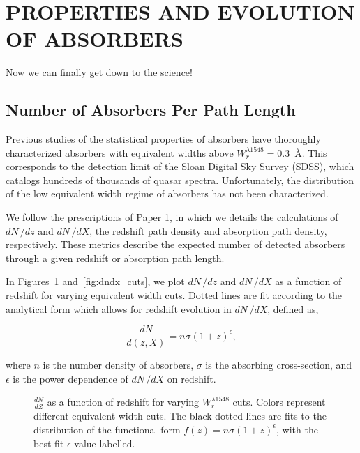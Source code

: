 \section{\MakeUppercase{Properties and Evolution of {\CIV} Absorbers}}
\label{ch6}

Now we can finally get down to the science!

\subsection{Number of Absorbers Per Path Length}
\label{ch6:dndx}


Previous studies of the statistical properties of {\CIV} absorbers have thoroughly characterized {\CIV} absorbers with equivalent widths above $W_r^{\lambda1548} = 0.3$~{\AA}. This corresponds to the detection limit of the Sloan Digital Sky Survey (SDSS), which catalogs hundreds of thousands of quasar spectra. Unfortunately, the distribution of the low equivalent width regime of {\CIV} absorbers has not been characterized.

We follow the prescriptions of Paper 1, in which we details the calculations of $dN\,/dz$ and $dN\,/dX$, the redshift path density and absorption path density, respectively. These metrics describe the expected number of detected absorbers through a given redshift or absorption path length.

In Figures~\ref{fig:dndz_cuts} and~\ref{fig:dndx_cuts}, we plot $dN\,/dz$ and $dN\,/dX$ as a function of redshift for varying equivalent width cuts. Dotted lines are fit according to the analytical form which allows for redshift evolution in $dN\,/dX$, defined as,

\begin{equation}
\frac{dN}{d(z,X)} = n\sigma (1 + z)^{\epsilon},
\label{eqn:dndxfit}
\end{equation}

where $n$ is the number density of {\CIV} absorbers, $\sigma$ is the absorbing cross-section, and $\epsilon$ is the power dependence of $dN\,/dX$ on redshift.

\begin{figure}[bth]
\caption{$\frac{dN}{dZ}$ as a function of redshift for varying $W_r^{\lambda1548}$ cuts. Colors represent different equivalent width cuts. The black dotted lines are fits to the distribution of the functional form $f(z) = n\sigma (1 + z)^{\epsilon}$, with the best fit $\epsilon$ value labelled.}
\label{fig:dndz_cuts}
\end{figure}

